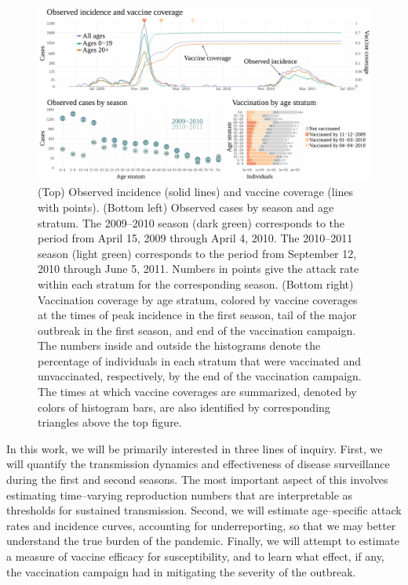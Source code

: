 \begin{figure}
	\centering
	\includegraphics[width=\linewidth]{figures/fludat_plots}
	\caption[A(H1N1)pdm09 incidence and vaccination data from Finland, April 15, 2009 --- June 5, 2011.]{(Top) Observed incidence (solid lines) and vaccine coverage (lines with points). (Bottom left) Observed cases by season and age stratum. The 2009--2010 season (dark green) corresponds to the period from April 15, 2009 through April 4, 2010. The 2010--2011 season (light green) corresponds to the period from September 12, 2010 through June 5, 2011. Numbers in points give the attack rate within each stratum for the corresponding season. (Bottom right) Vaccination coverage by age stratum, colored by vaccine coverages at the times of peak incidence in the first season, tail of the major outbreak in the first season, and end of the vaccination campaign. The numbers inside and outside the histograms denote the percentage of individuals in each stratum that were vaccinated and unvaccinated, respectively, by the end of the vaccination campaign. The times at which vaccine coverages are summarized, denoted by colors of histogram bars, are also identified by corresponding triangles above the top figure.}
	\label{fig:finland_fludat}
\end{figure}

In this work, we will be primarily interested in three lines of inquiry. First, we will quantify the transmission dynamics and effectiveness of disease surveillance during the first and second seasons. The most important aspect of this involves estimating time--varying reproduction numbers that are interpretable as thresholds for sustained transmission. Second, we will estimate age--specific attack rates and incidence curves, accounting for underreporting, so that we may better understand the true burden of the pandemic. Finally, we will attempt to estimate a measure of vaccine efficacy for susceptibility, and to learn what effect, if any, the vaccination campaign had in mitigating the severity of the outbreak.

